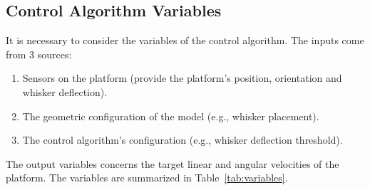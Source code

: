 \subsection{Control Algorithm Variables}

It is necessary to consider the variables of the control algorithm.
The inputs come from 3 sources:
\begin{enumerate}
    \item Sensors on the platform (provide the platform's position, orientation and whisker deflection).
    \item The geometric configuration of the model (e.g., whisker placement).
    \item The control algorithm's configuration (e.g., whisker deflection threshold).
\end{enumerate}
The output variables concerns the target linear and angular velocities of the platform.
The variables are summarized in Table~\ref{tab:variables}.

\newcommand{\branch}[3]{%
    \scalebox{0.75}{$\left\{
                         \begin{array}{@{}l@{\quad}l@{}}
                             #2, & \text{if } #1,\\[0.5em]
                             #3, & \text{otherwise.}
                         \end{array}
    \right.$}%
}


